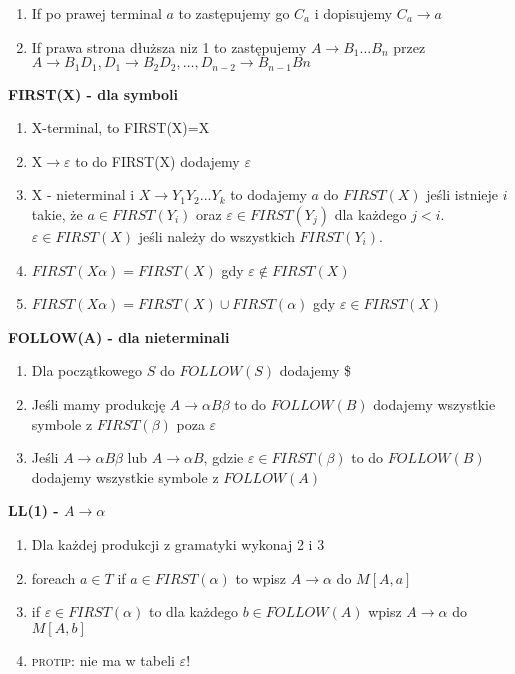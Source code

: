 \begin{multicols}{3}
\begin{enumerate}
      \item If po prawej terminal $a$ to zastępujemy go $C_{a}$ i dopisujemy $C_{a} \rightarrow a$
      \item If prawa strona dłuższa niz 1 to zastępujemy $A \rightarrow B_{1} \ldots B_{n}$ przez \\
    $A \rightarrow B_{1}D_{1}, D_{1} \rightarrow B_{2}D_{2}, \ldots ,D_{n-2} \rightarrow B_{n-1}B{n}$
    \end{enumerate}
    \textbf{FIRST(X) - dla symboli}
    \begin{enumerate}
      \item X-terminal, to FIRST(X)={X}
      \item X$\rightarrow \varepsilon$ to do FIRST(X) dodajemy $\varepsilon$
      \item X - nieterminal i $X \rightarrow Y_{1}Y_{2}...Y_{k}$ to dodajemy $a$ do $FIRST(X)$ jeśli istnieje $i$ takie, że $a \in FIRST(Y_{i})$ oraz $\varepsilon \in FIRST(Y_{j})$ dla każdego $j<i$. \\ $\varepsilon \in FIRST(X)$ jeśli należy do wszystkich $FIRST(Y_{i})$. 
      \item $FIRST(X\alpha) = FIRST(X)$ gdy $\varepsilon \notin FIRST(X)$
      \item $FIRST(X\alpha) = FIRST(X) \cup FIRST(\alpha)$ gdy $\varepsilon \in FIRST(X)$
    \end{enumerate}
    \textbf{FOLLOW(A) - dla nieterminali}
    \begin{enumerate}
      \item Dla początkowego $S$ do $FOLLOW(S)$ dodajemy \$
      \item Jeśli mamy produkcję $A\rightarrow\alpha B \beta$ to do $FOLLOW(B)$ dodajemy wszystkie symbole z $FIRST(\beta)$ poza $\varepsilon$
      \item Jeśli $A\rightarrow\alpha B \beta$ lub $A\rightarrow\alpha B $, gdzie $\varepsilon \in FIRST(\beta)$ to do $FOLLOW(B)$ dodajemy wszystkie symbole z $FOLLOW(A)$
    \end{enumerate}
    \textbf{LL(1) - $A \rightarrow \alpha$}
    \begin{enumerate}
      \item Dla każdej produkcji z gramatyki wykonaj 2 i 3
      \item foreach $a \in T$ if $a \in FIRST(\alpha)$ to wpisz $A\rightarrow \alpha$ do $M[A,a]$
      \item if $\varepsilon \in FIRST(\alpha)$ to dla każdego $b \in FOLLOW(A)$ wpisz $A\rightarrow \alpha$ do $M[A,b]$
      \item \textsc{protip}: nie ma w tabeli $\varepsilon$!

\end{enumerate}
\end{multicols}
